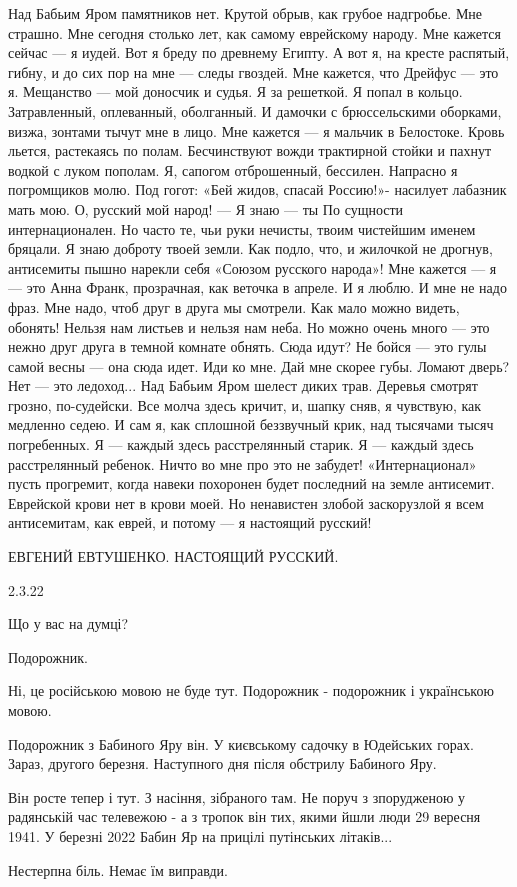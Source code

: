 \raggedcolumns
\begin{multicols}{2} %
\setlength{\parindent}{0pt}

\obeycr
Над Бабьим Яром памятников нет.
Крутой обрыв, как грубое надгробье.
Мне страшно.
Мне сегодня столько лет,
как самому еврейскому народу.
\smallskip
Мне кажется сейчас —
я иудей.
Вот я бреду по древнему Египту.
А вот я, на кресте распятый, гибну,
и до сих пор на мне — следы гвоздей.
\smallskip
Мне кажется, что Дрейфус —
это я.
Мещанство —
мой доносчик и судья.
\smallskip
Я за решеткой.
Я попал в кольцо.
Затравленный,
оплеванный,
оболганный.
\smallskip
И дамочки с брюссельскими оборками,
визжа, зонтами тычут мне в лицо.
Мне кажется —
я мальчик в Белостоке.
Кровь льется, растекаясь по полам.
\smallskip
Бесчинствуют вожди трактирной стойки
и пахнут водкой с луком пополам.
Я, сапогом отброшенный, бессилен.
Напрасно я погромщиков молю.
\smallskip
Под гогот:
«Бей жидов, спасай Россию!»-
насилует лабазник мать мою.
\smallskip
О, русский мой народ! —
Я знаю —
ты
По сущности интернационален.
\smallskip
Но часто те, чьи руки нечисты,
твоим чистейшим именем бряцали.
Я знаю доброту твоей земли.
\smallskip
Как подло,
что, и жилочкой не дрогнув,
антисемиты пышно нарекли
себя «Союзом русского народа»!
\smallskip
Мне кажется —
я — это Анна Франк,
прозрачная,
как веточка в апреле.
\smallskip
И я люблю.
И мне не надо фраз.
Мне надо,
чтоб друг в друга мы смотрели.
\smallskip
Как мало можно видеть,
обонять!
Нельзя нам листьев
и нельзя нам неба.
\smallskip
Но можно очень много —
это нежно
друг друга в темной комнате обнять.
Сюда идут?
\smallskip
Не бойся — это гулы
самой весны —
она сюда идет.
Иди ко мне.
\smallskip
Дай мне скорее губы.
Ломают дверь?
Нет — это ледоход...
Над Бабьим Яром шелест диких трав.
\smallskip
Деревья смотрят грозно,
по-судейски.
Все молча здесь кричит,
и, шапку сняв,
я чувствую,
как медленно седею.
\smallskip
И сам я,
как сплошной беззвучный крик,
над тысячами тысяч погребенных.
\smallskip
Я —
каждый здесь расстрелянный старик.
\smallskip
Я —
каждый здесь расстрелянный ребенок.
\smallskip
Ничто во мне
про это не забудет!
\smallskip
«Интернационал»
пусть прогремит,
когда навеки похоронен будет
последний на земле антисемит.
Еврейской крови нет в крови моей.
Но ненавистен злобой заскорузлой
я всем антисемитам,
как еврей,
и потому —
я настоящий русский!
\restorecr
\end{multicols} %

ЕВГЕНИЙ ЕВТУШЕНКО. НАСТОЯЩИЙ РУССКИЙ.

2.3.22

Що у вас на думці?

Подорожник.

Ні, це російською мовою не буде тут. Подорожник - подорожник і українською мовою. 

Подорожник з Бабиного Яру він. У києвському садочку в Юдейських горах. Зараз,
другого березня. Наступного дня після обстрилу Бабиного Яру.

Він росте тепер і тут. З насіння, зібраного там. Не поруч з зпорудженою у
радянській час телевежою - а з тропок він тих, якими йшли люди 29 вересня 1941.
У березні 2022 Бабин Яр на прицілі путінських літаків...

Нестерпна біль. Немає їм виправди.

